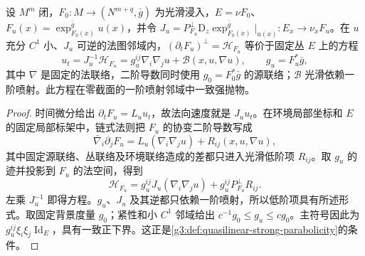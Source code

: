 \begin{lemma}\label{g3:lem:mcf-normal-graph-parabolic}
	设 \(M^m\) 闭，\(F_0:M\to(N^{m+q},\bar g)\) 为光滑浸入，\(E=\nu F_0\)、\(F_u(x)=\exp_{F_0(x)}^{\bar g}u(x)\)，并令 \(J_u=P_{F_u}^{\perp}\mathrm D_z\exp_{F_0(x)}^{\bar g}|_{u(x)}:E_x\to\nu_xF_u\)。在 \(u\) 充分 \(C^1\) 小、\(J_u\) 可逆的法图邻域内，\((\partial_tF_u)^\perp=\mathcal H_{F_u}\) 等价于固定丛 \(E\) 上的方程
	\begin{equation}\label{g3:eq:mcf-normal-graph-pde}
		u_t=J_u^{-1}\mathcal H_{F_u}
		=g_u^{ij}\nabla_i\nabla_j u+\mathcal B(x,u,\nabla u),
		\qquad g_u=F_u^*\bar g,
	\end{equation}
	其中 \(\nabla\) 是固定的法联络，二阶导数同时使用 \(g_0=F_0^*\bar g\) 的源联络；\(\mathcal B\) 光滑依赖一阶喷射。此方程在零截面的一阶喷射邻域中一致强抛物。
\end{lemma}
\begin{proof}
	时间微分给出 \(\partial_tF_u=L_u u_t\)，故法向速度就是 \(J_u u_t\)。在环境局部坐标和 \(E\) 的固定局部标架中，链式法则把 \(F_u\) 的协变二阶导数写成
	\[
	\bar\nabla_i\partial_jF_u
	=L_u(\nabla_i\nabla_j u)+R_{ij}(x,u,\nabla u),
	\]
	其中固定源联络、丛联络及环境联络造成的差都只进入光滑低阶项 \(R_{ij}\)。取 \(g_u\) 的迹并投影到 \(F_u\) 的法空间，得到
	\[
	\mathcal H_{F_u}=g_u^{ij}J_u(\nabla_i\nabla_j u)
	+g_u^{ij}P_{F_u}^\perp R_{ij}.
	\]
	左乘 \(J_u^{-1}\) 即得方程。\(g_u\)、\(J_u\) 及其逆都只依赖一阶喷射，所以低阶项具有所述形式。取固定背景度量 \(g_0\)；紧性和小 \(C^1\) 邻域给出 \(c^{-1}g_0\le g_u\le c g_0\)。主符号因此为 \(g_u^{ij}\xi_i\xi_j\operatorname{Id}_E\)，具有一致正下界。这正是\cref{g3:def:quasilinear-strong-parabolicity}的条件。
\end{proof}

